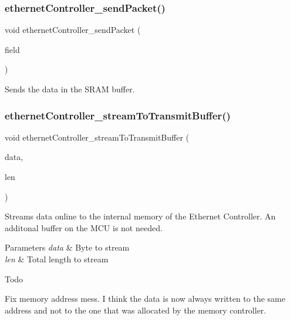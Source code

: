 \subsubsection{\texorpdfstring{ethernetController\_sendPacket()}{ethernetController\_sendPacket()}}
{\footnotesize\ttfamily void ethernet\+Controller\+\_\+send\+Packet (\begin{DoxyParamCaption}\item[{\mbox{\hyperlink{group__memory_ga1d04d80fae40964f55d2df46b5d64785}{memory\+Field\+\_\+t}}}]{field }\end{DoxyParamCaption})}



Sends the data in the S\+R\+AM buffer. 

\mbox{\label{group__data__transmission_ga9c0d9b39642cf6b7e220b9f0b44e3e02}} 
\subsubsection{\texorpdfstring{ethernetController\_streamToTransmitBuffer()}{ethernetController\_streamToTransmitBuffer()}}
{\footnotesize\ttfamily void ethernet\+Controller\+\_\+stream\+To\+Transmit\+Buffer (\begin{DoxyParamCaption}\item[{uint8\+\_\+t}]{data,  }\item[{uint16\+\_\+t}]{len }\end{DoxyParamCaption})}

Streams data online to the internal memory of the Ethernet Controller. An additonal buffer on the M\+CU is not needed. 
\begin{DoxyParams}{Parameters}
{\em data} & Byte to stream \\
\hline
{\em len} & Total length to stream \\
\hline
\end{DoxyParams}
\begin{DoxyRefDesc}{Todo}
\item[\mbox{\hyperlink{todo__todo000002}{Todo}}]Fix memory address mess. I think the data is now always written to the same address and not to the one that was allocated by the memory controller. \end{DoxyRefDesc}
\mbox{\label{group__data__transmission_ga858fd557b9ef00b3fd8166381e415bec}} 

